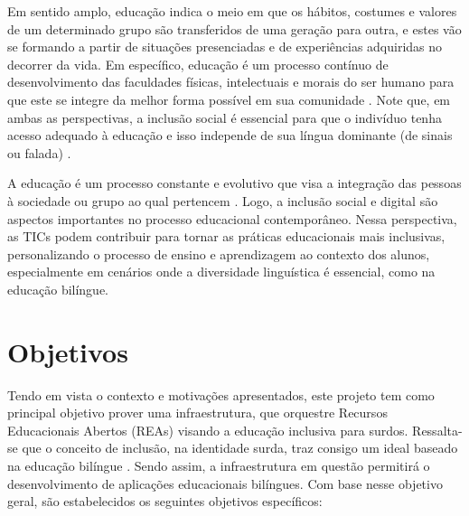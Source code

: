 Em sentido amplo, educação indica o meio em que os hábitos, costumes e valores de um determinado grupo são transferidos de uma geração para outra, e estes vão se formando a partir de situações presenciadas e de experiências adquiridas no decorrer da vida. Em específico, educação é um processo contínuo de desenvolvimento das faculdades físicas, intelectuais e morais do ser humano para que este se integre da melhor forma possível em sua comunidade \cite{Cilli2017,Quadros2019}. Note que, em ambas as perspectivas, a inclusão social é essencial para que o indivíduo tenha acesso adequado à educação e isso independe de sua língua dominante (de sinais ou falada) \cite{Quadros2019}. 

A educação é um processo constante e evolutivo que visa a integração das pessoas à sociedade ou grupo ao qual pertencem \cite{Cilli2017,Quadros2019}. Logo, a inclusão social e digital são aspectos importantes no processo educacional contemporâneo. Nessa perspectiva, as TICs podem contribuir para tornar as práticas educacionais mais inclusivas, personalizando o processo de ensino e aprendizagem ao contexto dos alunos, especialmente em cenários onde a diversidade linguística é essencial, como na educação bilíngue.

\section{Objetivos}

Tendo em vista o contexto e motivações apresentados, este projeto tem como principal objetivo prover uma infraestrutura, que orquestre Recursos Educacionais Abertos (REAs) visando a educação inclusiva para surdos. Ressalta-se que o conceito de inclusão, na identidade surda, traz consigo um ideal baseado na educação bilíngue \cite{Quadros2019}. Sendo assim, a infraestrutura em questão permitirá o desenvolvimento de aplicações educacionais bilíngues. %
Com base nesse objetivo geral, são estabelecidos os seguintes objetivos específicos:

